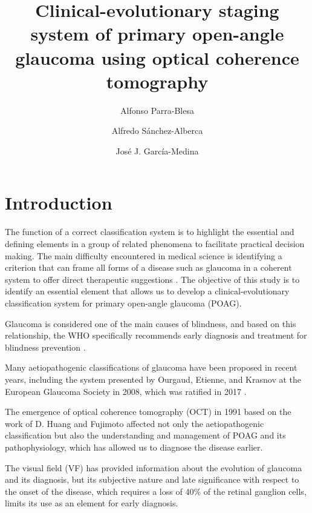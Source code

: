 \documentclass[fleqn,10pt]{wlscirep}
\title{Clinical-evolutionary staging system of primary open-angle glaucoma using optical coherence tomography}
\author[1,*]{Alfonso Parra-Blesa}
\author[1]{Alfredo Sánchez-Alberca}
\author[2]{José J. García-Medina}
\affil[1]{San Pablo CEU, , Madrid, Spain}
\affil[2]{Malaga, Spain}
\affil[*]{alf.parra.ce@ceindo.ceu.es}
\begin{document}
\flushbottom
\maketitle

\thispagestyle{empty}


\section*{Introduction}

The function of a correct classification system is to highlight the essential and defining elements in a group of related phenomena to facilitate practical decision making. The main difficulty encountered in medical science is identifying a criterion that can frame all forms of a disease such as glaucoma in a coherent system to offer direct therapeutic suggestions \cite{society:2017:terminology}. The objective of this study is to identify an essential element that allows us to develop a clinical-evolutionary classification system for primary open-angle glaucoma (POAG).

Glaucoma is considered one of the main causes of blindness, and based on this relationship, the WHO specifically recommends early diagnosis and treatment for blindness prevention \cite{thylefors:1994:bull}.

Many aetiopathogenic classifications of glaucoma have been proposed in recent years, including the system presented by Ourgaud, Etienne, and Krasnov at the European Glaucoma Society in 2008, which was ratified in 2017 \cite{society:2017:terminology, krasnov:1965:pathogenic, etiennerourgaud:1961:lexploration}.

The emergence of optical coherence tomography (OCT) in 1991 based on the work of D. Huang and Fujimoto \cite{huang:1991:optical} affected not only the aetiopathogenic classification but also the understanding and management of POAG and its pathophysiology, which has allowed us to diagnose the disease earlier.

The visual field (VF) has provided information about the evolution of glaucoma and its diagnosis, but its subjective nature and late significance with respect to the onset of the disease, which requires a loss of 40\% of the retinal ganglion cells, limits its use as an element for early diagnosis\cite{quigley:1982:optic}.
\end{document}
